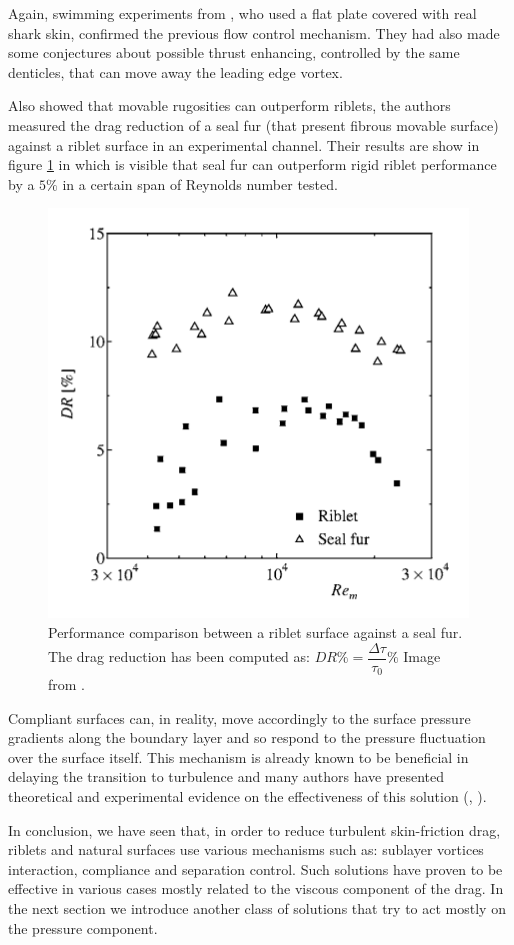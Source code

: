 Again, swimming experiments from \citet{Oeffner785}, who used a flat plate covered with real shark skin, confirmed the previous flow control mechanism. They had also made some conjectures about possible thrust enhancing, controlled by the same denticles, that can move away the leading edge vortex.

Also \citet{itoh2006turbulent} showed that movable rugosities can outperform riblets, the authors measured the drag reduction of a seal fur (that present fibrous movable surface) against a riblet surface in an experimental channel. Their results are show in figure \ref{fig:seal} in which is visible that seal fur can outperform  rigid riblet performance by a $5\%$ in a certain span of Reynolds number tested.

\begin{figure}[h]
\centering
\includegraphics[width=0.5\linewidth]{chapter_1/seal}
\caption{Performance comparison between a riblet surface against a seal fur. The drag reduction has been computed as: $DR \% = \dfrac{ \Delta \tau}{\tau_{0}} \%$ Image from \citet{itoh2006turbulent}.}
\label{fig:seal}
\end{figure}


Compliant surfaces can, in reality, move accordingly to the surface pressure gradients along the boundary layer and so respond to the pressure fluctuation over the surface itself.
This mechanism is already known to be beneficial in delaying the transition to turbulence and many authors have presented theoretical and experimental evidence on the effectiveness of this solution (\citet{carpenter1990status}, \citet{bushnell1977effect}).

In conclusion, we have seen that, in order to reduce turbulent skin-friction drag, riblets and natural surfaces use various mechanisms such as: sublayer vortices interaction, compliance and separation control. Such solutions have proven to be effective in various cases mostly related to the viscous component of the drag.
In the next section we introduce another class of solutions that try to act mostly on the pressure component.


